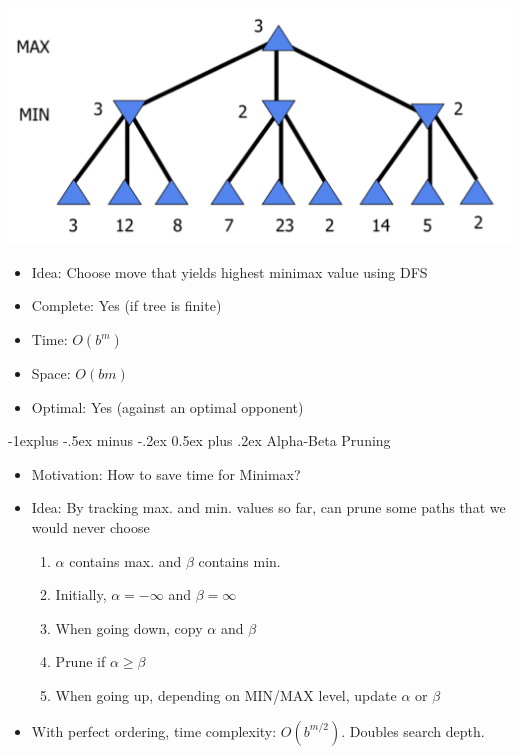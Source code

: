 \documentclass{article}
\makeatletter
\renewcommand{\subsection}{\@startsection{subsection}{2}{0mm}%
    {-1explus -.5ex minus -.2ex}%
    {0.5ex plus .2ex}%
{\normalfont\normalsize\bfseries}}
\makeatother
\begin{document}
\begin{multicols*}{3}
\includegraphics[scale=0.15]{minimax}

\begin{itemize}
    \item Idea: Choose move that yields highest minimax value using DFS
    \item Complete: Yes (if tree is finite)
    \item Time: $O(b^m)$
    \item Space: $O(bm)$
    \item Optimal: Yes (against an optimal opponent)
\end{itemize}

\subsection{Alpha-Beta Pruning}

\begin{itemize}
    \item Motivation: How to save time for Minimax?
    \item Idea: By tracking max. and min. values so far, can prune some paths that we would never choose
    \begin{enumerate}
        \item $\alpha$ contains max. and $\beta$ contains min.
        \item Initially, $\alpha = -\infty$ and $\beta = \infty$
        \item When going down, copy $\alpha$ and $\beta$
        \item Prune if $\alpha \geq \beta$
        \item When going up, depending on MIN/MAX level, update $\alpha$ or $\beta$
    \end{enumerate}
    \item With perfect ordering, time complexity: $O(b^{m/2})$. Doubles search depth.
\end{itemize}


\end{multicols*}
\end{document}
